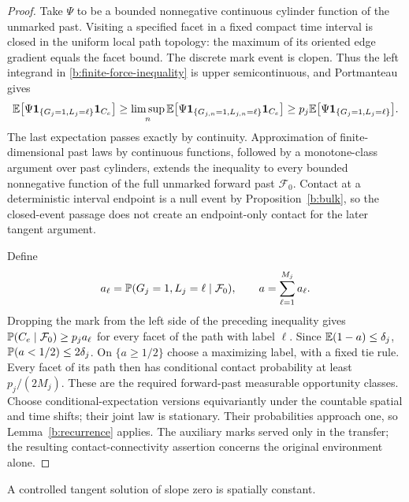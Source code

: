 \begin{proof}
Take $\Psi$ to be a bounded nonnegative continuous cylinder function
of the unmarked past. Visiting a specified facet in a fixed compact
time interval is closed in the uniform local path topology: the
maximum of its oriented edge gradient equals the facet bound. The
discrete mark event is clopen. Thus the left integrand in
\eqref{b:finite-force-inequality} is upper semicontinuous, and
Portmanteau gives
\[
 \mathbb E\bigl[\Psi\mathbf1_{\{G_j=1,L_j=\ell\}}\mathbf1_{C_e}\bigr]
 \ge \limsup_n
 \mathbb E\bigl[\Psi\mathbf1_{\{G_{j,n}=1,L_{j,n}=\ell\}}
                    \mathbf1_{C_e}\bigr]
 \ge p_j\mathbb E\bigl[\Psi\mathbf1_{\{G_j=1,L_j=\ell\}}\bigr].
\]
The last expectation passes exactly by continuity. Approximation of
finite-dimensional past laws by continuous functions, followed by a
monotone-class argument over past cylinders, extends the inequality
to every bounded nonnegative function of the full unmarked forward
past $\mathcal F_0$. Contact at a deterministic interval endpoint is
a null event by Proposition~\ref{b:bulk}, so the closed-event passage
does not create an endpoint-only contact for the later tangent argument.

Define
\[
 a_\ell=\mathbb P(G_j=1,L_j=\ell\mid\mathcal F_0),
 \qquad a=\sum_{\ell=1}^{M_j}a_\ell.
\]
Dropping the mark from the left side of the preceding inequality gives
$\mathbb P(C_e\mid\mathcal F_0)\ge p_j a_\ell$ for every facet of
the path with label $\ell$. Since $\mathbb E(1-a)\le\delta_j$,
$\mathbb P(a<1/2)\le2\delta_j$. On $\{a\ge1/2\}$ choose a
maximizing label, with a fixed tie rule. Every facet of its path then
has conditional contact probability at least $p_j/(2M_j)$.
These are the required forward-past measurable opportunity classes.
Choose conditional-expectation versions equivariantly under the
countable spatial and time shifts; their joint law is stationary.
Their probabilities approach one, so Lemma~\ref{b:recurrence} applies.
The auxiliary marks served only in the transfer; the resulting
contact-connectivity assertion concerns the original environment alone.
\end{proof}

\begin{lemma}\label{b:zero-slope}
A controlled tangent solution of slope zero is spatially constant.
\end{lemma}

